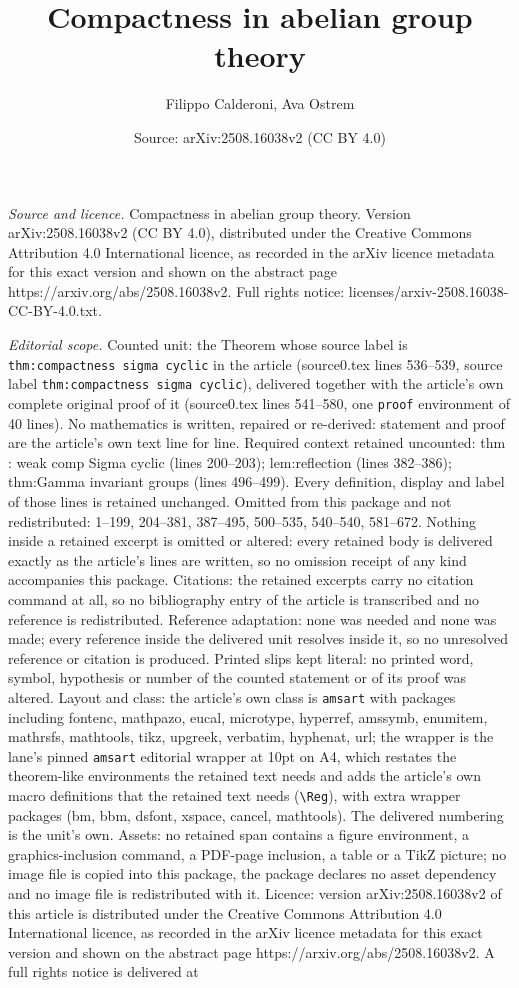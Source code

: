 \documentclass[10pt,a4paper]{amsart}
\title[Compactness in abelian group theory]{Compactness in abelian group theory}
\author{Filippo Calderoni, Ava Ostrem}
\date{Source: arXiv:2508.16038v2 (CC BY 4.0)}
\begin{document}
\maketitle

\noindent\emph{Source and licence.} Compactness in abelian group theory. Version arXiv:2508.16038v2 (CC BY 4.0), distributed under the Creative Commons Attribution 4.0 International licence, as recorded in the arXiv licence metadata for this exact version and shown on the abstract page https://arxiv.org/abs/2508.16038v2. Full rights notice: licenses/arxiv-2508.16038-CC-BY-4.0.txt.\par\smallskip

\noindent\textit{Editorial scope.} Counted unit: the Theorem whose source label is \texttt{thm:compactness sigma cyclic} in the article (source0.tex lines 536--539, source label \texttt{thm:compactness sigma cyclic}), delivered together with the article's own complete original proof of it (source0.tex lines 541--580, one \texttt{proof} environment of 40 lines). No mathematics is written, repaired or re-derived: statement and proof are the article's own text line for line. Required context retained uncounted: thm : weak comp Sigma cyclic (lines 200--203); lem:reflection (lines 382--386); thm:Gamma invariant groups (lines 496--499). Every definition, display and label of those lines is retained unchanged. Omitted from this package and not redistributed: 1--199, 204--381, 387--495, 500--535, 540--540, 581--672. Nothing inside a retained excerpt is omitted or altered: every retained body is delivered exactly as the article's lines are written, so no omission receipt of any kind accompanies this package. Citations: the retained excerpts carry no citation command at all, so no bibliography entry of the article is transcribed and no reference is redistributed. Reference adaptation: none was needed and none was made; every reference inside the delivered unit resolves inside it, so no unresolved reference or citation is produced. Printed slips kept literal: no printed word, symbol, hypothesis or number of the counted statement or of its proof was altered. Layout and class: the article's own class is \texttt{amsart} with packages including fontenc, mathpazo, eucal, microtype, hyperref, amssymb, enumitem, mathrsfs, mathtools, tikz, upgreek, verbatim, hyphenat, url; the wrapper is the lane's pinned \texttt{amsart} editorial wrapper at 10pt on A4, which restates the theorem-like environments the retained text needs and adds the article's own macro definitions that the retained text needs (\texttt{\textbackslash Reg}), with extra wrapper packages (bm, bbm, dsfont, xspace, cancel, mathtools). The delivered numbering is the unit's own. Assets: no retained span contains a figure environment, a graphics-inclusion command, a PDF-page inclusion, a table or a TikZ picture; no image file is copied into this package, the package declares no asset dependency and no image file is redistributed with it. Licence: version arXiv:2508.16038v2 of this article is distributed under the Creative Commons Attribution 4.0 International licence, as recorded in the arXiv licence metadata for this exact version and shown on the abstract page https://arxiv.org/abs/2508.16038v2. A full rights notice is delivered at 
\end{document}
